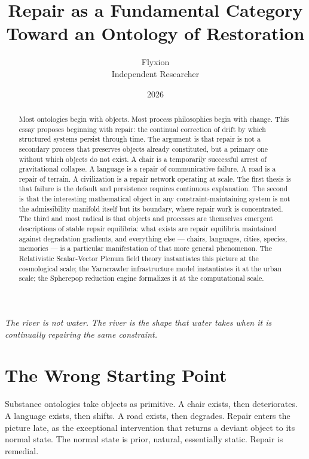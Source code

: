 \documentclass[11pt, a4paper]{article}
\title{\textbf{Repair as a Fundamental Category}\\
{\large Toward an Ontology of Restoration}}
\author{Flyxion \\ \small Independent Researcher}
\date{2026}
\theoremstyle{definition}
\theoremstyle{remark}
\begin{document}
\maketitle

\begin{abstract}
Most ontologies begin with objects. Most process philosophies begin with change.
This essay proposes beginning with repair: the continual correction of drift by
which structured systems persist through time. The argument is that repair is
not a secondary process that preserves objects already constituted, but a
primary one without which objects do not exist. A chair is a temporarily
successful arrest of gravitational collapse. A language is a repair of
communicative failure. A road is a repair of terrain. A civilization is a
repair network operating at scale. The first thesis is that failure is the
default and persistence requires continuous explanation. The second is that
the interesting mathematical object in any constraint-maintaining system is
not the admissibility manifold itself but its boundary, where repair work is
concentrated. The third and most radical is that objects and processes are
themselves emergent descriptions of stable repair equilibria: what exists are
repair equilibria maintained against degradation gradients, and everything
else --- chairs, languages, cities, species, memories --- is a particular
manifestation of that more general phenomenon. The Relativistic Scalar-Vector
Plenum field theory instantiates this picture at the cosmological scale; the
Yarncrawler infrastructure model instantiates it at the urban scale; the
Spherepop reduction engine formalizes it at the computational scale.
\end{abstract}

\newpage

\epigraph{\textit{The river is not water. The river is the shape that water
takes when it is continually repairing the same constraint.}}{}

\section{The Wrong Starting Point}

Substance ontologies take objects as primitive. A chair exists, then deteriorates.
A language exists, then shifts. A road exists, then degrades. Repair enters the
picture late, as the exceptional intervention that returns a deviant object to
its normal state. The normal state is prior, natural, essentially static. Repair
is remedial.
\end{document}
